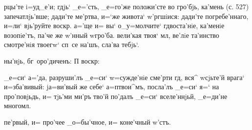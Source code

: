 рцы'те i=уд_е'и; гдjь` _е='сть, _е=го'же положи'сте во 
гро'бjь, ка'мень (с. 527) запечатлjь'вше; дади'те 
ме'ртва, и=`же живота` w'ргшiися: дади'те 
погребе'ннаго, и=ли` вjь'руйте воскр. а='ще и= вы` 
о_у=молчите` гд воста'нiе, ка'менiе возопiе'тъ, па'че 
же w'нный w\т гро'ба. вели'кая твоя` мл, ве'лiе 
та'инство смотре'нiя твоегw` сп~се на'шъ, сла'ва тебjь`.

ны'нjь, бг~оро'диченъ: П%
воскр:%

_е=си` а='да, разруши'лъ _е=си` w=сужде'нiе сме'рти 
гд, вся^ w\т сjьте'й врага` и=зба'вивый: jа=ви'вый же 
себе` а=п твои^мъ, посла'лъ _е=си` я=` на 
про'повjьдь, и= тjь'ми ми'ръ тво'й по'далъ _е=си` 
вселе'ннjьй, _е=ди'не многомл.

пе'рвый, и= про'чее _о=бы'чное, и= коне'чный w'стъ.%
